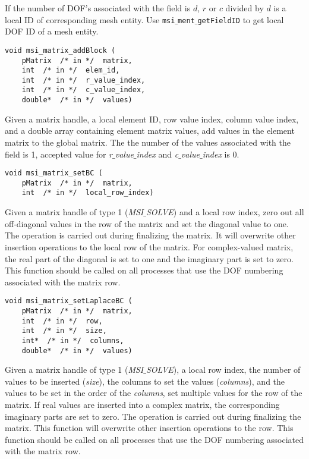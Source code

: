 If the number of DOF's associated with the field is $d$, $r$ or $c$ divided by $d$ is a local ID of corresponding mesh entity. Use \texttt{msi$\_$ment$\_$getFieldID} to get local DOF ID of a mesh entity.

\begin{verbatim}
void msi_matrix_addBlock (
    pMatrix  /* in */  matrix, 
    int  /* in */  elem_id, 
    int  /* in */  r_value_index, 
    int  /* in */  c_value_index, 
    double*  /* in */  values)
\end{verbatim}\vspace{-.5cm}\hspace{1cm}
Given a matrix handle, a local element ID, row value index, column value index, and a double array containing element matrix values, add values in the element matrix to the global matrix. The the number of the values associated with the field is 1, accepted value for \textit{r$\_$value$\_$index} and \textit{c$\_$value$\_$index} is 0.

 
\begin{verbatim}
void msi_matrix_setBC (
    pMatrix  /* in */  matrix, 
    int  /* in */  local_row_index)
\end{verbatim}\vspace{-.5cm}\hspace{1cm}
Given a matrix handle of type 1 (\textit{MSI$\_$SOLVE}) and a local row index, zero out all off-diagonal values in the row of the matrix and set the diagonal value to one. The operation is carried out during finalizing the matrix. It will overwrite other insertion operations to the local row of the matrix. For complex-valued matrix, the real part of the diagonal is set to one and the imaginary part is set to zero.
This function should be called on all processes that use the DOF numbering associated with the matrix row. 

\begin{verbatim}
void msi_matrix_setLaplaceBC (
    pMatrix  /* in */  matrix, 
    int  /* in */  row, 
    int  /* in */  size, 
    int*  /* in */  columns, 
    double*  /* in */  values)
\end{verbatim}\vspace{-.5cm}\hspace{1cm}
Given a matrix handle of type 1 (\textit{MSI$\_$SOLVE}), a local row index, the  number of values to be inserted (\textit{size}), the columns to set the values (\textit{columns}), and the values to be set in the order of the \textit{columns}, set multiple values for the row of the matrix. If real values are inserted into a complex matrix, the corresponding imaginary parts are set to zero. The operation is carried out during finalizing the matrix. 
This function will overwrite other insertion operations to the row. This function should be called on all processes that use the DOF numbering associated with the matrix row.

